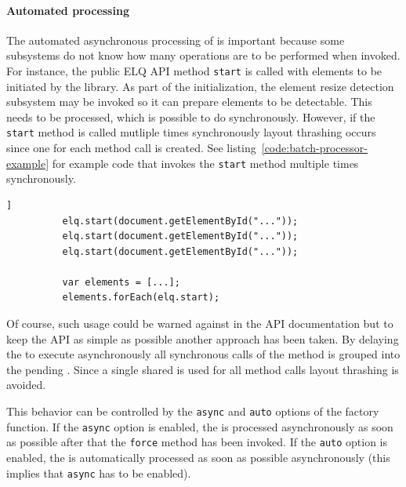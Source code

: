 \documentclass[a4paper,11pt]{kth-mag}
\newcommand{\code}[1]{\texttt{#1}}
\begin{document}
        \paragraph{Automated processing}
        The automated asynchronous processing of  is important because some subsystems do not know how many operations are to be performed when invoked.
        For instance, the public \gls{ELQ} \gls{API} method \code{start} is called with \glspl{element} to be initiated by the library.
        As part of the initialization, the element resize detection subsystem may be invoked so it can prepare \glspl{element} to be detectable.
        This needs to be  processed, which is possible to do synchronously.
        However, if the \code{start} method is called mutliple times synchronously \gls{layout thrashing} occurs since one  for each method call is created.
        See listing~\ref{code:batch-processor-example} for example code that invokes the \code{start} method multiple times synchronously.
        \begin{lstlisting}[gobble=10,label={code:batch-processor-example},caption={Example of multiple synchronous calls to the \gls{ELQ} \code{start} method.},captionpos=b]]
          elq.start(document.getElementById("..."));
          elq.start(document.getElementById("..."));
          elq.start(document.getElementById("..."));

          var elements = [...];
          elements.forEach(elq.start);
        \end{lstlisting}
        Of course, such usage could be warned against in the \gls{API} documentation but to keep the \gls{API} as simple as possible another approach has been taken.
        By delaying the  to execute asynchronously all synchronous calls of the method is grouped into the pending .
        Since a single shared  is used for all method calls \gls{layout thrashing} is avoided.
        
        This behavior can be controlled by the \code{async} and \code{auto} options of the  factory function.
        If the \code{async} option is enabled, the  is processed asynchronously as soon as possible after that the \code{force} method has been invoked.
        If the \code{auto} option is enabled, the  is automatically processed as soon as possible asynchronously (this implies that \code{async} has to be enabled).
\end{document}
